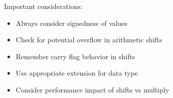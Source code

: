 \begin{remark}
Important considerations:
\begin{itemize}
  \item Always consider signedness of values
  \item Check for potential overflow in arithmetic shifts
  \item Remember carry flag behavior in shifts
  \item Use appropriate extension for data type
  \item Consider performance impact of shifts vs multiply
\end{itemize}
\end{remark}

